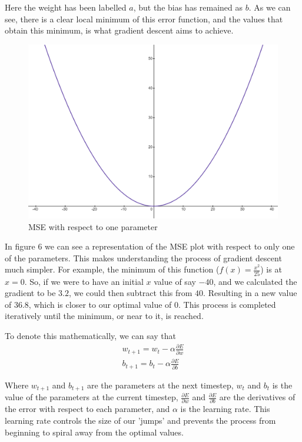 \documentclass{article}
\begin{document}
    Here the weight has been labelled $a$, but the bias has remained as $b$. As we can see, there is a clear local minimum of this error function,
    and the values that obtain this minimum, is what gradient descent aims to achieve. 
    
    \begin{figure}
        \centering
        \includegraphics[scale=0.2]{image.png}
        \caption{MSE with respect to one parameter}
    \end{figure}
    In figure 6 we can see a representation of the MSE plot with respect to only one of the parameters. This makes understanding the process of gradient
    descent much simpler. For example, the minimum of this function ($f(x) = \frac{x^2}{25}$) is at $x = 0$. So, if we were to have an initial $x$ value of say $-40$,
    and we calculated the gradient to be $3.2$, we could then subtract this from $40$. Resulting in a new value of $36.8$, which is closer to our optimal value of $0$.
    This process is completed iteratively until the minimum, or near to it, is reached.

    To denote this mathematically, we can say that 
    \begin{align}
        w_{t+1} = w_t - \alpha \frac{\partial E}{\partial w}\\
        b_{t+1} = b_t - \alpha \frac{\partial E}{\partial b}
    \end{align}

    Where $w_{t+1}$ and $b_{t+1}$ are the parameters at the next timestep, $w_t$ and $b_t$ is the value of the parameters at the current timestep, 
    $\frac{\partial E}{\partial w}$ and $\frac{\partial E}{\partial b}$ are the derivatives of the error with respect to each parameter, 
    and $\alpha$ is the learning rate. This learning rate controls the size of our 'jumps' and prevents the process from beginning to spiral away
    from the optimal values.
\end{document}
